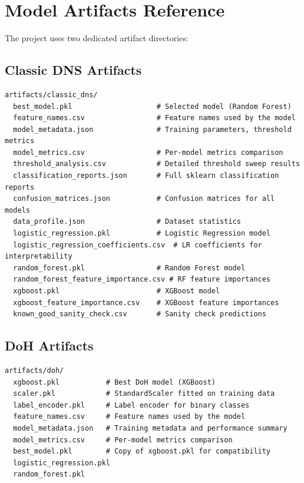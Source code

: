 \documentclass[12pt,a4paper]{article}
\begin{document}
\section{Model Artifacts Reference}

The project uses two dedicated artifact directories:

\subsection{Classic DNS Artifacts}

\begin{lstlisting}
artifacts/classic_dns/
  best_model.pkl                    # Selected model (Random Forest)
  feature_names.csv                 # Feature names used by the model
  model_metadata.json               # Training parameters, threshold metrics
  model_metrics.csv                 # Per-model metrics comparison
  threshold_analysis.csv            # Detailed threshold sweep results
  classification_reports.json       # Full sklearn classification reports
  confusion_matrices.json           # Confusion matrices for all models
  data_profile.json                 # Dataset statistics
  logistic_regression.pkl           # Logistic Regression model
  logistic_regression_coefficients.csv  # LR coefficients for interpretability
  random_forest.pkl                 # Random Forest model
  random_forest_feature_importance.csv # RF feature importances
  xgboost.pkl                       # XGBoost model
  xgboost_feature_importance.csv    # XGBoost feature importances
  known_good_sanity_check.csv       # Sanity check predictions
\end{lstlisting}

\subsection{DoH Artifacts}

\begin{lstlisting}
artifacts/doh/
  xgboost.pkl           # Best DoH model (XGBoost)
  scaler.pkl            # StandardScaler fitted on training data
  label_encoder.pkl     # Label encoder for binary classes
  feature_names.csv     # Feature names used by the model
  model_metadata.json   # Training metadata and performance summary
  model_metrics.csv     # Per-model metrics comparison
  best_model.pkl        # Copy of xgboost.pkl for compatibility
  logistic_regression.pkl
  random_forest.pkl
\end{lstlisting}
\end{document}
